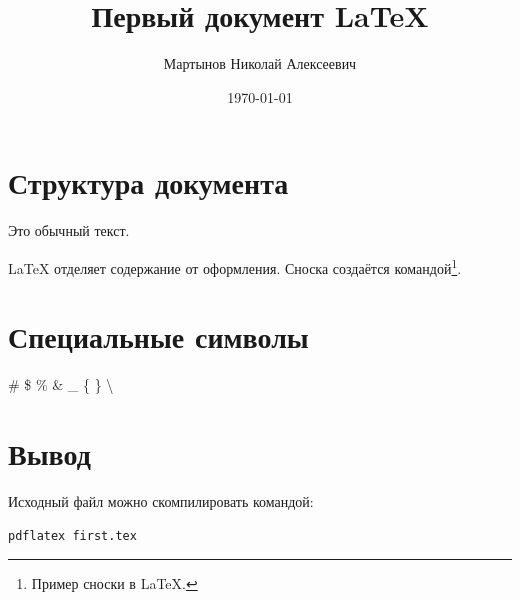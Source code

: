 \documentclass[a4paper,12pt]{article}
\title{Первый документ LaTeX}
\author{Мартынов Николай Алексеевич}
\date{\today}
\begin{document}
\maketitle

\section{Структура документа}
Это обычный текст. %

LaTeX отделяет содержание от оформления.
Сноска создаётся командой\footnote{Пример сноски в LaTeX.}.

\section{Специальные символы}
\# \$ \% \& \_ \{ \} \textbackslash

\section{Вывод}
Исходный файл можно скомпилировать командой:
\begin{verbatim}
pdflatex first.tex
\end{verbatim}
\end{document}
